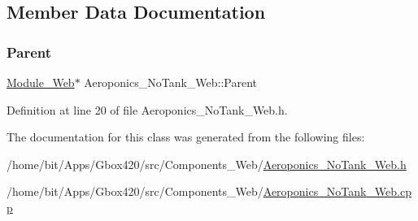 \subsection{Member Data Documentation}
\mbox{\label{class_aeroponics___no_tank___web_a0d3231552931448e24b0a4839301932f}} 
\subsubsection{\texorpdfstring{Parent}{Parent}}
{\footnotesize\ttfamily \hyperlink{class_module___web}{Module\+\_\+\+Web}$\ast$ Aeroponics\+\_\+\+No\+Tank\+\_\+\+Web\+::\+Parent\hspace{0.3cm}{\ttfamily [protected]}}



Definition at line 20 of file Aeroponics\+\_\+\+No\+Tank\+\_\+\+Web.\+h.



The documentation for this class was generated from the following files\+:\begin{DoxyCompactItemize}
\item 
/home/bit/\+Apps/\+Gbox420/src/\+Components\+\_\+\+Web/\hyperlink{_aeroponics___no_tank___web_8h}{Aeroponics\+\_\+\+No\+Tank\+\_\+\+Web.\+h}\item 
/home/bit/\+Apps/\+Gbox420/src/\+Components\+\_\+\+Web/\hyperlink{_aeroponics___no_tank___web_8cpp}{Aeroponics\+\_\+\+No\+Tank\+\_\+\+Web.\+cpp}\end{DoxyCompactItemize}
